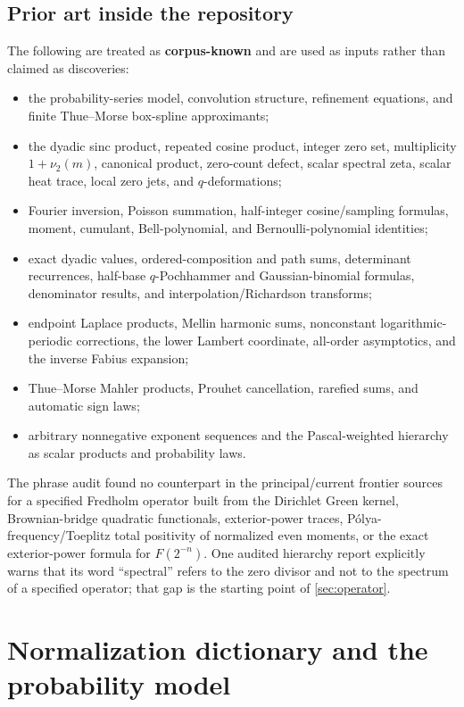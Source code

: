 \documentclass[11pt,oneside]{article}
\theoremstyle{definition}
\newcommand{\vtwo}{\nu_2}
\newcommand{\CorpusKnown}{\textcolor{linkblue}{\textbf{corpus-known}}}
\begin{document}
\subsection{Prior art inside the repository}

The following are treated as \CorpusKnown{} and are used as inputs rather than claimed
as discoveries:
\begin{itemize}[leftmargin=2em]
\item the probability-series model, convolution structure, refinement equations, and
      finite Thue--Morse box-spline approximants;
\item the dyadic sinc product, repeated cosine product, integer zero set, multiplicity
      \(1+\vtwo(m)\), canonical product, zero-count defect, scalar spectral zeta,
      scalar heat trace, local zero jets, and \(q\)-deformations;
\item Fourier inversion, Poisson summation, half-integer cosine/sampling formulas,
      moment, cumulant, Bell-polynomial, and Bernoulli-polynomial identities;
\item exact dyadic values, ordered-composition and path sums, determinant recurrences,
      half-base \(q\)-Pochhammer and Gaussian-binomial formulas, denominator results,
      and interpolation/Richardson transforms;
\item endpoint Laplace products, Mellin harmonic sums, nonconstant logarithmic-periodic
      corrections, the lower Lambert coordinate, all-order asymptotics, and the inverse
      Fabius expansion;
\item Thue--Morse Mahler products, Prouhet cancellation, rarefied sums, and automatic
      sign laws;
\item arbitrary nonnegative exponent sequences and the Pascal-weighted hierarchy as
      scalar products and probability laws.
\end{itemize}

The phrase audit found no counterpart in the principal/current frontier sources for a
specified Fredholm operator built from the Dirichlet Green kernel, Brownian-bridge
quadratic functionals, exterior-power traces, P\'olya-frequency/Toeplitz total
positivity of normalized even moments, or the exact exterior-power formula for
\(F(2^{-n})\).  One audited hierarchy report explicitly warns that its word
``spectral'' refers to the zero divisor and not to the spectrum of a specified operator;
that gap is the starting point of \cref{sec:operator}.

\section{Normalization dictionary and the probability model}
\label{sec:normalization}
\end{document}
